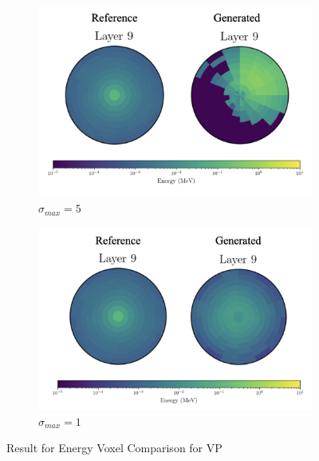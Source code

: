 \begin{figure}
\begin{subfigure}[b]{0.23\textwidth}
        \includegraphics[width=\textwidth]{Figures/vp5_6.png}
        \caption{$\sigma_{max}=5$}
        \label{fig:vp5_6}
    \end{subfigure}
    \hfill
    \begin{subfigure}[b]{0.23\textwidth}  %
        \centering
        \includegraphics[width=\textwidth]{Figures/vp1_6.png}
        \caption{$\sigma_{max}=1$}
        \label{fig:vp1_6}
    \end{subfigure}
    \caption{Result for Energy Voxel Comparison for VP}
\end{figure}

